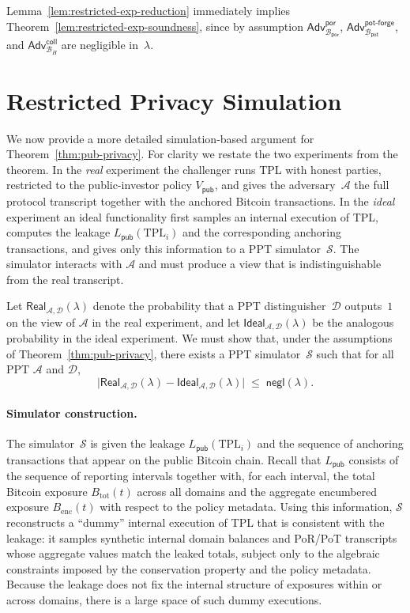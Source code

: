 \documentclass[11pt]{article}
\begin{document}
Lemma~\ref{lem:restricted-exp-reduction} immediately implies
Theorem~\ref{lem:restricted-exp-soundness}, since by assumption
$\mathsf{Adv}^{\mathsf{por}}_{\mathcal{B}_{\mathsf{por}}}$,
$\mathsf{Adv}^{\mathsf{pot\mbox{-}forge}}_{\mathcal{B}_{\mathsf{pot}}}$, and
$\mathsf{Adv}^{\mathsf{coll}}_{\mathcal{B}_H}$ are negligible in~$\lambda$.

\medskip

\section{Restricted Privacy Simulation}
\label{app:privacy-reduction}

We now provide a more detailed simulation-based argument for
Theorem~\ref{thm:pub-privacy}.
For clarity we restate the two experiments from the theorem.
In the \emph{real} experiment the challenger runs TPL with honest parties,
restricted to the public-investor policy $V_{\mathsf{pub}}$, and gives the
adversary~$\mathcal{A}$ the full protocol transcript together with the anchored
Bitcoin transactions.
In the \emph{ideal} experiment an ideal functionality first samples an internal
execution of TPL, computes the leakage $L_{\mathsf{pub}}(\mathrm{TPL}_i)$ and the
corresponding anchoring transactions, and gives only this information to a PPT
simulator~$\mathcal{S}$.
The simulator interacts with $\mathcal{A}$ and must produce a view that is
indistinguishable from the real transcript.

Let $\mathsf{Real}_{\mathcal{A},\mathcal{D}}(\lambda)$ denote the probability
that a PPT distinguisher~$\mathcal{D}$ outputs~$1$ on the view of $\mathcal{A}$
in the real experiment, and let
$\mathsf{Ideal}_{\mathcal{A},\mathcal{D}}(\lambda)$ be the analogous probability
in the ideal experiment.
We must show that, under the assumptions of Theorem~\ref{thm:pub-privacy}, there
exists a PPT simulator~$\mathcal{S}$ such that for all PPT $\mathcal{A}$ and
$\mathcal{D}$,
\[
  \bigl|\mathsf{Real}_{\mathcal{A},\mathcal{D}}(\lambda)
        - \mathsf{Ideal}_{\mathcal{A},\mathcal{D}}(\lambda)\bigr|
  \;\leq\;
  \mathsf{negl}(\lambda).
\]

\paragraph{Simulator construction.}
The simulator~$\mathcal{S}$ is given the leakage
$L_{\mathsf{pub}}(\mathrm{TPL}_i)$ and the sequence of anchoring transactions
that appear on the public Bitcoin chain.
Recall that $L_{\mathsf{pub}}$ consists of the sequence of reporting intervals
together with, for each interval, the total Bitcoin exposure
$B_{\mathrm{tot}}(t)$ across all domains and the aggregate encumbered exposure
$B_{\mathrm{enc}}(t)$ with respect to the policy metadata.
Using this information, $\mathcal{S}$ reconstructs a ``dummy'' internal
execution of TPL that is consistent with the leakage:
it samples synthetic internal domain balances and PoR/PoT transcripts whose
aggregate values match the leaked totals, subject only to the algebraic
constraints imposed by the conservation property and the policy metadata.
Because the leakage does not fix the internal structure of exposures within or
across domains, there is a large space of such dummy executions.
\end{document}
